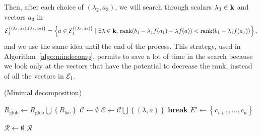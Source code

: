 Then, after each choice of $(\lambda_2, a_2)$, we will search through scalars
$\lambda_3\in\mathbf{k}$ and vectors $a_3$ in
\[
  \mathcal{E}_1^{\left\{ (\lambda_1, a_1), (\lambda_2, a_2) \right\}} = \left\{
    a\in\mathcal{E}_1^{ \left\{ (\lambda_1, a_1)
    \right\}}\;|\;\exists\lambda\in\mathbf{k},\,\operatorname{rank}(b_1-\lambda_1f(a_1)-\lambda f(a))
    <\operatorname{rank}(b_1-\lambda_1f(a_1))
\right\},
\]
and we use the same idea until the end of the process. This strategy, used in
Algorithm~\ref{algo:mindecomp}, permits to
save a lot of time in the search because we look only at the vectors that have
the potential to decrease the rank, instead of all the vectors in $\mathcal{E}_1$.
\begin{algorithm}
  \caption{(Minimal decomposition)}
  \label{algo:mindecomp}
  \begin{algorithmic}[1]

    \State $R_\text{glob}\gets R_\text{glob}\bigcup\left\{R_\text{loc}\right\}$
    \Else
    \State $\mathcal C\gets\emptyset$
    \ForAll{$\lambda\in\K$}
    \State $\mathcal C\gets\mathcal C\bigcup\left\{ (\lambda, a) \right\}$
    \State \textbf{break}
    \EndIf
    \EndFor
    \EndFor
      \State $E'\gets\left\{ c_{i+1}, \dots, c_u \right\}$
    \State {}
    \EndFor
    \EndIf
    \EndProcedure

   \State $\mathcal R\gets\emptyset$
    \State {}
    \State \Return $\mathcal R$
  \end{algorithmic}
\end{algorithm}


